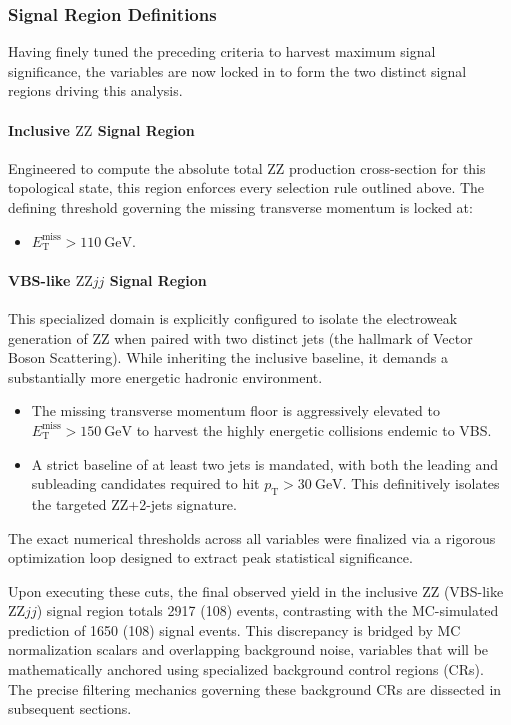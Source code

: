 \subsubsection{Signal Region Definitions}
Having finely tuned the preceding criteria to harvest maximum signal significance, the variables are now locked in to form the two distinct signal regions driving this analysis.

\vspace{0.1 cm}
\paragraph{\textbf{Inclusive $\text{ZZ}$ Signal Region}}
Engineered to compute the absolute total $\text{ZZ}$ production cross-section for this topological state, this region enforces every selection rule outlined above. The defining threshold governing the missing transverse momentum is locked at:
\begin{itemize}
    \item $E_{\text{T}}^{\text{miss}} > 110~\text{GeV}$.
\end{itemize}

\vspace{0.1 cm}
\paragraph{\textbf{VBS-like $\text{ZZ}jj$ Signal Region}}
This specialized domain is explicitly configured to isolate the electroweak generation of $\text{ZZ}$ when paired with two distinct jets (the hallmark of Vector Boson Scattering). While inheriting the inclusive baseline, it demands a substantially more energetic hadronic environment.
\begin{itemize}
    \item The missing transverse momentum floor is aggressively elevated to $E_{\text{T}}^{\text{miss}} > 150~\text{GeV}$ to harvest the highly energetic collisions endemic to VBS.
    \item A strict baseline of at least two jets is mandated, with both the leading and subleading candidates required to hit $p_{\text{T}} > 30~\text{GeV}$. This definitively isolates the targeted $\text{ZZ}$+2-jets signature.
\end{itemize}
The exact numerical thresholds across all variables were finalized via a rigorous optimization loop designed to extract peak statistical significance.

Upon executing these cuts, the final observed yield in the inclusive $\text{ZZ}$ (VBS-like $\text{ZZ}jj$) signal region totals 2917 (108) events, contrasting with the MC-simulated prediction of 1650 (108) signal events. This discrepancy is bridged by MC normalization scalars and overlapping background noise, variables that will be mathematically anchored using specialized background control regions (CRs). The precise filtering mechanics governing these background CRs are dissected in subsequent sections. 

